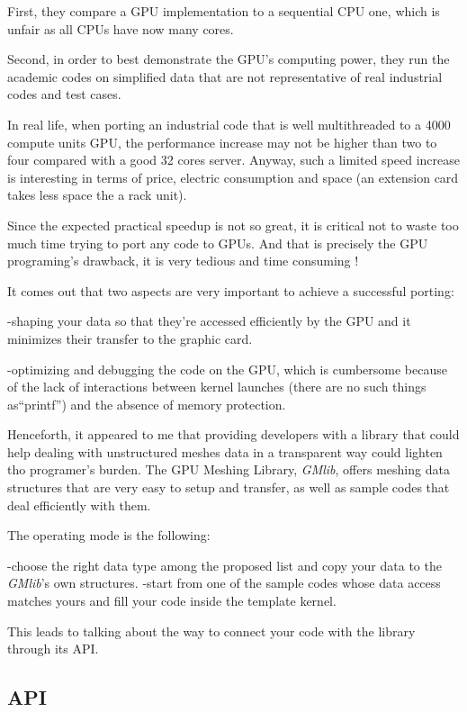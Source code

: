 \documentclass[a4paper,12pt]{article}
\begin{document}
First, they compare a GPU implementation to a sequential CPU one, which is unfair as all CPUs have now many cores.

Second, in order to best demonstrate the GPU's computing power, they run the academic codes on simplified data that are not representative of real industrial codes and test cases.

In real life, when porting an industrial code that is well multithreaded to a 4000 compute units GPU, the performance increase may not be higher than two to four compared with a good 32 cores server. Anyway, such a limited speed increase is interesting in terms of price, electric consumption and space (an extension card takes less space the a rack unit).

Since the expected practical speedup is not so great, it is critical not to waste too much time trying to port any code to GPUs. And that is precisely the GPU programing's drawback, it is very tedious and time consuming !

It comes out that two aspects are very important to achieve a successful porting:

-shaping your data so that they're accessed efficiently by the GPU and it minimizes their transfer to the graphic card.

-optimizing and debugging the code on the GPU, which is cumbersome because of the lack of interactions between kernel launches (there are no such things as``printf'') and the absence of memory protection.

Henceforth, it appeared to me that providing developers with a library that could help dealing with unstructured meshes data in a transparent way could lighten tho programer's burden. The GPU Meshing Library, \emph{GMlib}, offers meshing data structures that are very easy to setup and transfer, as well as sample codes that deal efficiently with them.

The operating mode is the following:

-choose the right data type among the proposed list and copy your data to the \emph{GMlib}'s own structures.
-start from one of the sample codes whose data access matches yours and fill your code inside the template kernel.

This leads to talking about the way to connect your code with the library through its API.


\subsection{API}
\end{document}
